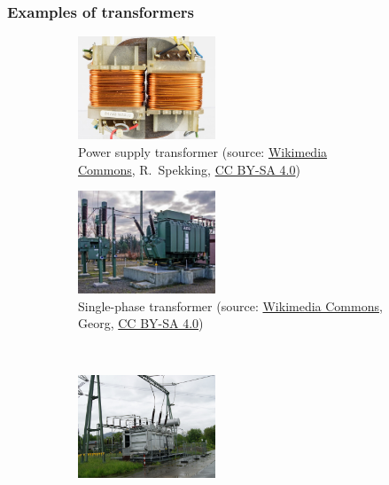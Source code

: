 \begin{frame}
	\frametitle{Examples of transformers}
	\begin{figure}
		\centering
		\begin{subfigure}[b]{0.49\textwidth}
			\centering
			\includegraphics[width=0.45\textwidth]{fig/lec04/Power_supply_transformer.jpg}
			\caption{Power supply transformer (source: \href{https://commons.wikimedia.org/wiki/File:Philips_N4422_-_power_supply_transformer-2098.jpg}{Wikimedia Commons}, R.~Spekking, \href{https://creativecommons.org/licenses/by-sa/4.0/deed}{CC BY-SA 4.0})}
		\end{subfigure}
		\hfill
		\begin{subfigure}[b]{0.49\textwidth}
			\centering
			\includegraphics[width=0.45\textwidth]{fig/lec04/Single_phase_transformer.jpg}
			\caption{Single-phase transformer (source: \href{https://commons.wikimedia.org/wiki/File:DB_Unterwerk_Güsen,_Trafo_p.jpg}{Wikimedia Commons}, Georg, \href{https://creativecommons.org/licenses/by-sa/4.0/deed.en}{CC BY-SA 4.0})}
		\end{subfigure}
		\\
		\begin{subfigure}[b]{0.49\textwidth}
			\centering
			\includegraphics[width=0.45\textwidth]{fig/lec04/Three_phase_transformer.jpg}

\end{subfigure}
\end{figure}
\end{frame}
